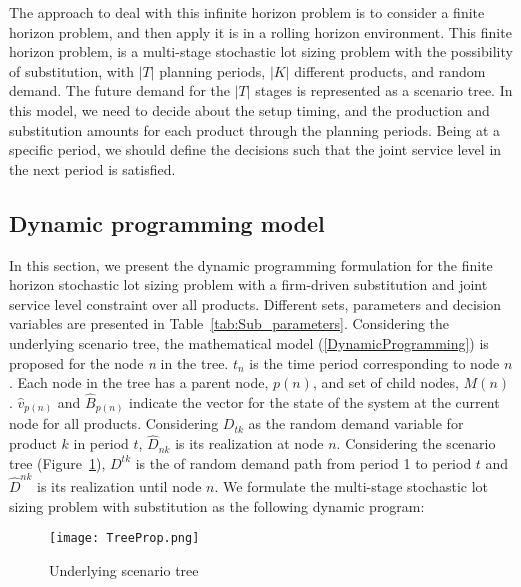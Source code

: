 \documentclass[10pt]{article}
\newcommand{\ti}{t} %
\newcommand{\TI}{T}
\newcommand{\ka}{k} %
\newcommand{\KA}{K}
\newcommand{\jey}{j} %
\newcommand{\Bi}{B} %
\newcommand{\Vi}{v} %
\newcommand{\InvPos}{inventory level after production }
\begin{document}
 
 








The approach to deal with this infinite horizon problem is to consider a finite horizon problem, and then apply it is in a rolling horizon environment. This finite horizon problem, is a multi-stage stochastic lot sizing problem with the possibility of substitution, with $|\TI|$ planning periods, $|\KA|$ different products, and random demand. The future demand for the $|\TI|$ stages is represented as a scenario tree. In this  model, we need to decide about the setup timing, and the production and substitution amounts for each product through the planning periods. Being at a specific period, we should define the decisions such that the joint service level in the next period is satisfied.

\subsection{Dynamic programming model}


In this section, we present the dynamic programming formulation for the finite horizon stochastic lot sizing problem with a firm-driven substitution and joint service level constraint over all products. Different sets, parameters and decision variables are presented in Table~\ref{tab:Sub_parameters}. Considering the underlying scenario tree, the mathematical model (\ref{DynamicProgramming}) is proposed for the node {\it n} in the tree. $\ti_{n}$ is the time period corresponding to node $n$.  Each node in the tree has a parent node, $p(n)$, and set of child nodes, $M(n)$. 
$\hat{\Vi}_{p(n)}$ and $\hat{\Bi}_{p(n)}$ indicate the vector for the state of the system at the current node for all products. Considering $D_{\ti \ka}$ as the random demand variable for product $\ka$ in period $\ti$, $\hat{D}_{n \ka}$ is its realization at node $n$. Considering the scenario tree (Figure~\ref{fig:Tree}), $D^{\ti \ka}$ is the of  random demand path from period 1 to period $\ti$ and $\hat{D}^{nk}$ is its realization until node $n$. We formulate the multi-stage stochastic lot sizing problem with substitution as the following dynamic program: 
\begin{figure}[!h]
\begin{center}
\texttt{[image: TreeProp.png]}
\caption{Underlying scenario tree} 
\label{fig:Tree}
\end{center}
\end{figure}
\end{document}
